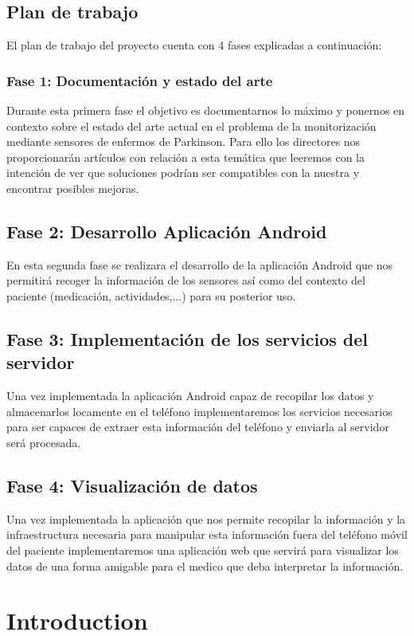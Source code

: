 \documentclass[11pt,spanish]{article}
\begin{document}
\subsection{Plan de trabajo}
El plan de trabajo del proyecto cuenta con 4 fases explicadas a continuación:

\subsubsection{Fase 1: Documentación y estado del arte}
Durante esta primera fase el objetivo es documentarnos lo máximo y ponernos en contexto sobre el estado del arte actual en el problema de la monitorización mediante sensores de enfermos de Parkinson. Para ello los directores nos proporcionarán artículos con relación a esta temática que leeremos con la intención de ver que soluciones podrían ser compatibles con la nuestra y encontrar posibles mejoras.

\subsection{Fase 2: Desarrollo Aplicación Android}
En esta segunda fase se realizara el desarrollo de la aplicación Android que nos permitirá recoger la información de los sensores así como del contexto del paciente (medicación, actividades,...) para su posterior uso.

\subsection{Fase 3: Implementación de los servicios del servidor}
Una vez implementada la aplicación Android capaz de recopilar los datos y almacenarlos locamente en el teléfono implementaremos los servicios necesarios para ser capaces de extraer esta información del teléfono y enviarla al servidor será procesada.

\subsection{Fase 4: Visualización de datos}
Una vez implementada la aplicación que nos permite recopilar la información y la infraestructura necesaria para manipular esta información fuera del teléfono móvil del paciente implementaremos una aplicación web que servirá para visualizar los datos de una forma amigable para el medico que deba interpretar la información.

\newpage

\section{Introduction}
\end{document}
